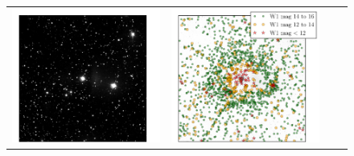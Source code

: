 \documentclass[12pt,preprint]{aastex}
\begin{document}
\begin{figure}
\begin{center}
\begin{tabular}{@{}c@{\spc}c@{\spc}c@{\spc}c@{}}
      \includegraphics[width=\figw]{bright-10} &
      \includegraphics[width=\figw]{bright-11} \\

\end{tabular}
\end{center}
\end{figure}
\end{document}
